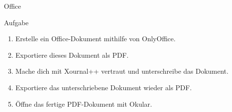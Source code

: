 \begin{frame}{Office}
    \vspace{0.5cm}
    \begin{alertblock}{Aufgabe}
        \pause
        \begin{enumerate}
            \item Erstelle ein Office-Dokument mithilfe von OnlyOffice.\pause
            \item Exportiere dieses Dokument als PDF.\pause
            \item Mache dich mit Xournal++ vertraut und unterschreibe das Dokument.\pause
            \item Exportiere das unterschriebene Dokument wieder als PDF.\pause
            \item Öffne das fertige PDF-Dokument mit Okular.
        \end{enumerate}
    \end{alertblock}
\end{frame}